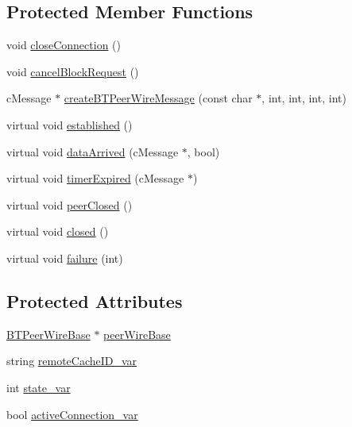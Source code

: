 \subsection*{Protected Member Functions}
\begin{DoxyCompactItemize}
\item 
void \hyperlink{classBTPeerWireCacheThread_a99d533084cc41ba0eb431786e611ed67}{close\+Connection} ()
\item 
void \hyperlink{classBTPeerWireCacheThread_a1443d7cf4e65960990d5eafbbdaa38be}{cancel\+Block\+Request} ()
\item 
c\+Message $\ast$ \hyperlink{classBTPeerWireCacheThread_a2877951d5f8147d380840d0964703157}{create\+B\+T\+Peer\+Wire\+Message} (const char $\ast$, int, int, int, int)
\item 
virtual void \hyperlink{classBTPeerWireCacheThread_abd3b5c0f91f4812fbbba05020a219e5d}{established} ()
\item 
virtual void \hyperlink{classBTPeerWireCacheThread_a2e60ec0775d674781d177982c6cadad9}{data\+Arrived} (c\+Message $\ast$, bool)
\item 
virtual void \hyperlink{classBTPeerWireCacheThread_ab65e46311fbacfb79e046d132cc626d6}{timer\+Expired} (c\+Message $\ast$)
\item 
virtual void \hyperlink{classBTPeerWireCacheThread_a010c0f0560e66bcecfe1a2a144f04d2d}{peer\+Closed} ()
\item 
virtual void \hyperlink{classBTPeerWireCacheThread_aa155e51409bf401597d3359f5106edf8}{closed} ()
\item 
virtual void \hyperlink{classBTPeerWireCacheThread_a7c1707a8368a36f544279a7e76b4295d}{failure} (int)
\end{DoxyCompactItemize}
\subsection*{Protected Attributes}
\begin{DoxyCompactItemize}
\item 
\hyperlink{classBTPeerWireBase}{B\+T\+Peer\+Wire\+Base} $\ast$ \hyperlink{classBTPeerWireCacheThread_a3b3958e3db0092891e2316c5867b93c4}{peer\+Wire\+Base}
\item 
string \hyperlink{classBTPeerWireCacheThread_a63ec54a272a54c81f7900e5a8cdf5f8a}{remote\+Cache\+I\+D\+\_\+var}
\item 
int \hyperlink{classBTPeerWireCacheThread_ab0fe60bb80ce09de5bc14153075af0b7}{state\+\_\+var}
\item 
bool \hyperlink{classBTPeerWireCacheThread_ab2d101d565b86e392386a1140feae26a}{active\+Connection\+\_\+var}
\end{DoxyCompactItemize}


